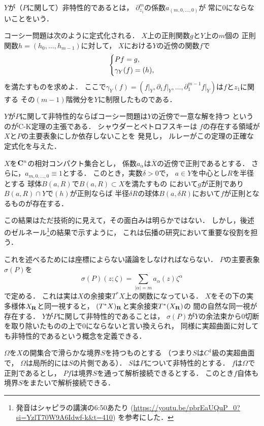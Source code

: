 \(Y\)が（\(P\)に関して）非特性的であるとは，
\(\partial_{z_1}^m\)の係数\(a_{(m,0,\dots,0)}\)が
常に0にならないことをいう．

コーシー問題は次のように定式化される．
\(X\)上の正則関数\(g\)と\(Y\)上の\(m\)個の
正則関数\(h=(h_0,\dots,h_{m-1})\)に対して，
\(X\)における\(Y\)の近傍の関数\(f\)で
\begin{equation}
    \begin{dcases}
        Pf=g,\\
        \gamma_Y(f)=(h),
    \end{dcases}
\end{equation}
を満たすものを求めよ．
ここで\(\gamma_Y(f)
=(f\rvert_Y,\partial_1f\rvert_Y,\dots
,\partial_1^{m-1}f\rvert_Y)\)は\(f\)と\(z_1\)に関する
その\((m-1)\)階微分を\(Y\)に制限したものである．

$Y$が$P$に関して非特性的ならばコーシー問題は$Y$の近傍で一意な解を持つ
というのがC-K定理の主張である．
シャウダーとペトロフスキーは
\(f\)の存在する領域が$X$と\(P\)の主要表象にしか依存しないことを
発見し，
ルレーがこの定理の正確な定式化を与えた．
\begin{THM}[C-K定理のルレーによる定式化]
    \(X\)を\(\mathbf{C}^n\)の相対コンパクト集合とし，
    係数\(a_\alpha\)は\(\overline{X}\)の近傍で正則であるとする．
    さらに，\(a_{m,0,\dots,0}\equiv1\)とする．
    このとき，実数\(\delta>0\)で，
    \(a\in Y\)を中心とし\(R\)を半径とする
    球体\(B(a,R)\)で\(B(a,R)\subset X\)を満たすもの
    において\(g\)が正則であり\(B(a,R)\cap Y\)で\((h)\)が正則ならば
    半径\(\delta R\)の球体\(B(a,\delta R)\)において\(f\)が正則となるものが存在する．
\end{THM}
この結果はただ技術的に見えて，その面白みは明らかではない．
しかし，後述のゼルネール\footnote{
    発音はシャピラの講演の6:50あたり (\url{https://youtu.be/pbrEaUQuP_0?si=YzlT70W9A6Idwf-k&t=410}) を参考にした．
}の結果で示すように，
これは伝播の研究において重要な役割を担う．

これを述べるためには座標によらない議論をしなければならない．
$P$の主要表象\(\sigma(P)\)を
\[
    \sigma(P)(z;\zeta)
    =\sum_{\lvert \alpha\rvert=m}a_\alpha(z)\zeta^\alpha
\]
で定める．
これは実は$X$の余接束$T^\ast X$上の関数になっている．
$X$をその下の実多様体$X_{\mathbf{R}}$と同一視すると，
$(T^\ast X)_{\mathbf{R}}$と実余接束$T^\ast(X_{\mathbf{R}})$の
間の自然な同一視が存在する．
$Y$が$P$に関して非特性的であることは，
$\sigma(P)$が$Y$の余法束から0切断を取り除いたものの上で0にならないと言い換えられ，
同様に実超曲面に対しても非特性的であるという概念を定義できる．

\begin{PRP}
    \(\Omega\)を\(X\)の開集合で滑らかな境界\(S\)を持つものとする
    （つまり\(S\)は\(C^1\)級の実超曲面で，
    \(\Omega\)は局所的には\(S\)の片側である）．
    \(S\)は\(P\)について非特性的とする．
    \(f\)は\(\Omega\)で正則であるとし，
    \(Pf\)は境界\(S\)を通って解析接続できるとする．
    このとき\(f\)自体も境界\(S\)をまたいで解析接続できる．
\end{PRP}

